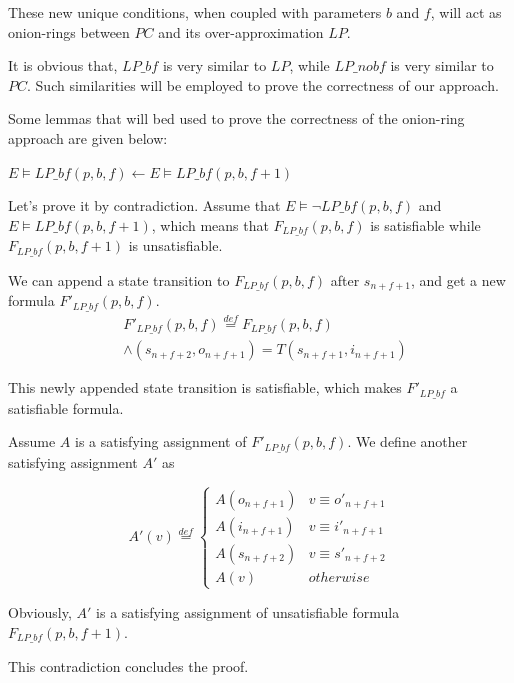 \documentclass[journal]{IEEEtran}
\begin{document}
These new unique conditions,
when coupled with parameters $b$ and $f$,
will act as onion-rings between $PC$ and its over-approximation $LP$.

It is obvious that,
$LP\_bf$ is very similar to $LP$,
while $LP\_nobf$ is very similar to $PC$.
Such similarities will be employed to prove the correctness of our approach.

Some lemmas that will bed used to prove the correctness of the onion-ring approach are given below:

\begin{lemma}\label{lma_bfinc}
$E\vDash LP\_bf(p,b,f)\gets E\vDash LP\_bf(p,b,f+1)$
\end{lemma}
\begin{IEEEproof}
Let's prove it by contradiction.
Assume that $E\vDash\neg LP\_bf(p,b,f)$ and $E\vDash LP\_bf(p,b,f+1)$,
which means that $F_{LP\_bf}(p,b,f)$ is satisfiable while $F_{LP\_bf}(p,b,f+1)$ is unsatisfiable.

We can append a state transition to $F_{LP\_bf}(p,b,f)$ after $s_{n+f+1}$,
and get a new formula $F'_{LP\_bf}(p,b,f)$.
\begin{equation}
\begin{split}
&F'_{LP\_bf}(p,b,f)\overset{def}{=}F_{LP\_bf}(p,b,f)\\
&\wedge(s_{n+f+2},o_{n+f+1})=T(s_{n+f+1},i_{n+f+1})
\end{split}
\end{equation}

This newly appended state transition is satisfiable,
which makes $F'_{LP\_bf}$ a satisfiable formula.

Assume $A$ is a satisfying assignment of $F'_{LP\_bf}(p,b,f)$.
We define another satisfying assignment $A'$ as

\begin{equation}
A'(v) \overset{def}{=} \left\{ \begin{array}{ll}
A(o_{n+f+1}) & v\equiv o'_{n+f+1} \\
A(i_{n+f+1}) & v\equiv i'_{n+f+1} \\
A(s_{n+f+2}) & v\equiv s'_{n+f+2} \\
A(v) & otherwise
\end{array}
\right.
\end{equation}

Obviously,
$A'$ is a satisfying assignment of unsatisfiable formula $F_{LP\_bf}(p,b,f+1)$.

This contradiction concludes the proof.
\end{IEEEproof}
\end{document}
